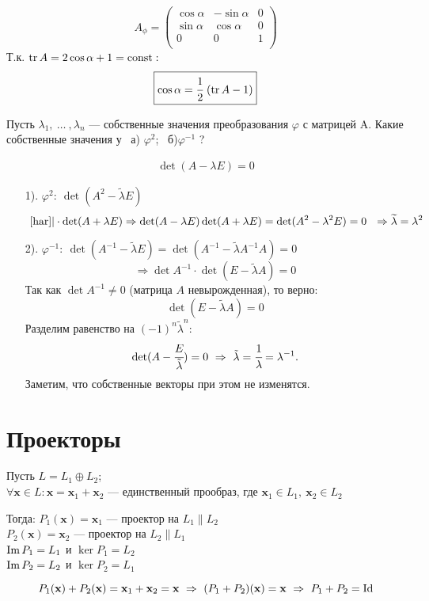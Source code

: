 $$A_{\phi}=\begin{pmatrix}
\cos \alpha & -\sin \alpha & 0\\
\sin \alpha & \cos \alpha & 0\\
0 & 0 & 1\\
\end{pmatrix}$$
Т.к.
$\operatorname{\mathop{tr}} A=2\cos \alpha +1 = \operatorname{\mathop{const}}:$
$$\boxed{\cos \alpha = \cfrac{1}{2}~ (\operatorname{\mathop{tr}} A-1)}$$

\begin{prim}	
Пусть $\lambda_1,~ \dots ~, \lambda_n$ --- собственные значения преобразования $\varphi$ с матрицей A. Какие собственные значения у ~а) $\varphi^2$;~ б)$\varphi^{-1}$ ?
	\end{prim}
\begin{align}
	\det(A-\lambda E)=0  \tag{$*$}
	\label{har} 
\end{align}

\begin{enumerate}
	\item[1).] $\varphi^2:~\det(A^2-\widetilde \lambda E)$\\
	$$~\eqref{har} |\cdot \det(A+\lambda E) \Rightarrow \det(A-\lambda E) \det(A+\lambda E)=\det(A^2-\lambda^2 E) = 0~~\Rightarrow \widetilde \lambda = \lambda^2$$
	
	\item[2).] $\varphi^{-1}:~\det(A^{-1}-\tilde {\lambda} E)= \det(A^{-1}-\tilde { \lambda} A^{-1}A)=0$%
	$$\Rightarrow \det A^{-1} \cdot \det(E-\tilde {\lambda} A)=0$$
	Так как $\det A^{-1} \ne 0$ (матрица $A$ невырожденная), то верно:
	 $$\det(E-\tilde {\lambda} A)=0$$
	 Разделим равенство на $(-1)^n \tilde {\lambda}^n$:
	 $$\det(A-\cfrac{E}{\tilde {\lambda}})=0 ~\Rightarrow~ \tilde {\lambda}=\cfrac{1}{\lambda}=\lambda^{-1}.$$
	 Заметим, что собственные векторы при этом не изменятся.
\end{enumerate}

\section{Проекторы}
Пусть $L=L_1 \oplus L_2$;\\
$\forall \textbf{x}\in L: \textbf{x}=\textbf{x$_1$}+\textbf{x$_2$}$ --- единственный прообраз, где $\textbf{x$_1$} \in L_1,~ \textbf{x$_2$} \in L_2$
\begin{center}
Тогда: $P_1(\textbf{x})=\textbf{x$_1$}$ --- проектор на $L_1 \parallel L_2$\\
$P_2(\textbf{x})=\textbf{x$_2$}$ --- проектор на $L_2 \parallel L_1$\\
$\operatorname{\mathop{Im}} P_1 = L_1$ и $\ker P_1=L_2$\\
$\operatorname{\mathop{Im}} P_2 = L_2$ и $\ker P_2=L_1$\\
\end{center}
$$P_1(\textbf{x})+P_2(\textbf{x})=\textbf{x$_1$}+\textbf{x$_2$}=\textbf{x}~\Rightarrow ~(P_1+P_2)(\textbf{x})=\textbf{x}~ \Rightarrow ~P_1+P_2=\operatorname{\mathop{Id}}$$%